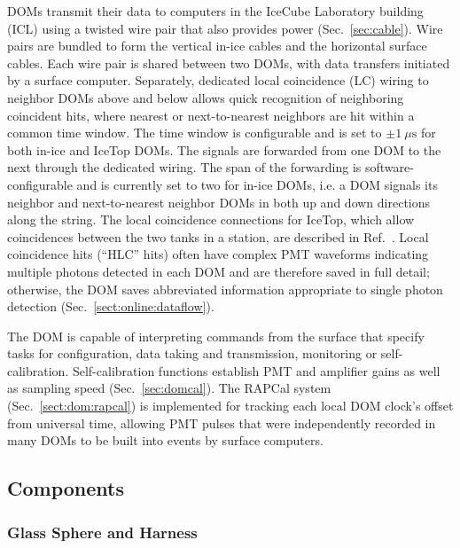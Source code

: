 DOMs transmit their data to computers in the IceCube Laboratory building (ICL)
using a twisted wire pair that also provides power (Sec.~\ref{sec:cable}).
Wire pairs are bundled to form the vertical in-ice cables and the horizontal surface
cables.  Each wire pair is shared between two DOMs, with data transfers
initiated by a surface computer.  Separately, dedicated local coincidence
(LC) wiring to neighbor DOMs above and below allows quick recognition of neighboring
coincident hits, where
nearest or next-to-nearest neighbors are hit within a common time
window. The time window is configurable and is set to $\pm1~\mu\mathrm{s}$
for both in-ice and IceTop DOMs. The signals are forwarded from one DOM to the next
through the dedicated wiring.  The span of the forwarding is
software-configurable and is currently set to two for in-ice DOMs,
i.e. a DOM signals its neighbor and next-to-nearest neighbor DOMs in
both up and down directions along the string. The local coincidence
connections for IceTop, which allow coincidences between the two tanks in a
station, are described in Ref.~\cite{ICECUBE:IceTop}. Local coincidence
hits (``HLC'' hits) often have complex PMT waveforms
indicating multiple photons detected in each DOM and are therefore saved
in full detail; otherwise, the DOM saves abbreviated information appropriate
to single photon detection (Sec.~\ref{sect:online:dataflow}).

The DOM is capable of interpreting commands from the surface that specify
tasks for configuration, data taking and transmission, monitoring or
self-calibration.  Self-calibration functions establish PMT and amplifier
gains as well as sampling speed (Sec.~\ref{sec:domcal}).  The RAPCal
system (Sec.~\ref{sect:dom:rapcal}) is implemented for tracking each
local DOM clock's offset from universal time, allowing PMT pulses that were
independently recorded in many DOMs to be built into events by surface
computers.

\subsection{\label{sec:dom_components}Components}

\subsubsection{\label{sec:sphere}Glass Sphere and Harness}

